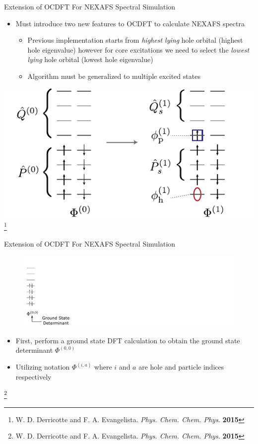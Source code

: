 \documentclass[t]{beamer}
\newcommand\blfootnote[1]{%
  \begingroup
  \renewcommand\thefootnote{}\footnote{#1}%
  \addtocounter{footnote}{-1}%
  \endgroup
}
\begin{document}
\begin{frame}{Extension of OCDFT For NEXAFS Spectral Simulation}
\begin{itemize}
\item Must introduce two new features to OCDFT to calculate NEXAFS spectra
		\begin{itemize}
		\item Previous implementation starts from \textit{highest lying} hole orbital (highest hole eigenvalue) however for core excitations we need to select the \textit{lowest lying} hole orbital (lowest hole eigenvalue)
		\item Algorithm must be generalized to multiple excited states
		\end{itemize}
\end{itemize}
\centering
\includegraphics[scale=0.85]{Figure1.pdf}
\blfootnote{W. D. Derricotte and F. A. Evangelista. \textit{Phys. Chem. Chem. Phys.} \textbf{2015}}
\end{frame}

\begin{frame}{Extension of OCDFT For NEXAFS Spectral Simulation}
\begin{figure}[!t]
\includegraphics[scale=0.65]{CMHP_alg1.pdf}
\end{figure}
\begin{itemize}
\item First, perform a ground state DFT calculation to obtain the ground state determinant $\Phi^{(0,0)}$
\item Utilizing notation $\Phi^{(i,a)}$ where $i$ and $a$ are hole and particle indices respectively
\end{itemize}
\blfootnote{W. D. Derricotte and F. A. Evangelista. \textit{Phys. Chem. Chem. Phys.} \textbf{2015}}
\end{frame}
\end{document}
